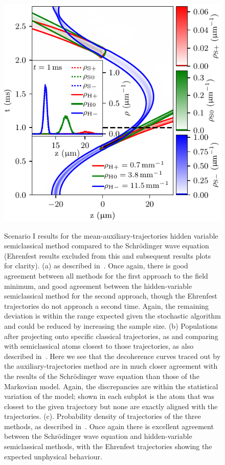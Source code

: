 {\begin{figure}
{    \includegraphics{figures/hidden_variables/hvsc_aux/trajectories.pdf}
    }
    \caption{Scenario I results for the mean-auxiliary-trajectories hidden variable semiclassical method compared to the Schr\"odinger wave equation (Ehrenfest results excluded from this and subsequent results plots for clarity). (a) as described in~. Once again, there is good agreement between all methods for the first approach to the field minimum, and good agreement between the hidden-variable semiclassical method for the second approach, though the Ehrenfest trajectories do not approach a second time. Again, the remaining deviation is within the range expected given the stochastic algorithm and could be reduced by increasing the sample size. (b) Populations after projecting onto specific classical trajectories, as and comparing with semiclassical atoms closest to those trajectories, as also described in~. Here we see that the decoherence curves traced out by the auxiliary-trajectories method are in much closer agreement with the results of the Schr\"odinger wave equation than those of the Markovian model. Again, the discrepancies are within the statistical variation of the model; shown in each subplot is the atom that was closest to the given trajectory but none are exactly aligned with the trajectories. (c). Probability density of trajectories of the three methods, as described in~. Once again there is excellent agreement between the Schr\"odinger wave equation and hidden-variable semiclassical methods, with the Ehrenfest trajectories showing the expected unphysical behaviour.}\label{fig:scenario_one_aux}
\end{figure}
\restoregeometry}

